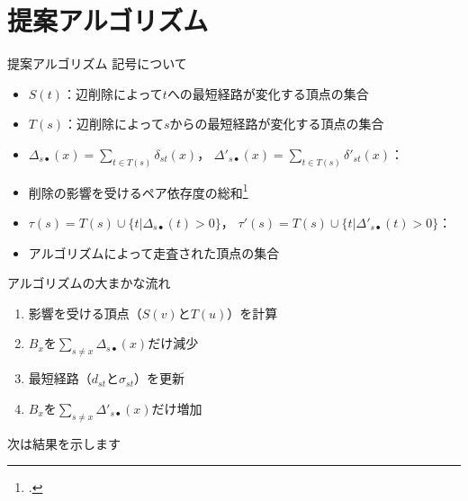 \documentclass[dvipdfmx,fleqn]{beamer}
\begin{document}
\section{提案アルゴリズム}
\begin{frame}[allowframebreaks]{提案アルゴリズム}
  記号について
  \begin{itemize}\small
    \item \alert{$S(t)$}：辺削除によって$t$への最短経路が変化する頂点の集合
    \item \alert{$T(s)$}：辺削除によって$s$からの最短経路が変化する頂点の集合
    \item \alert{$\Delta_{s\bullet}(x)$}$=\sum_{t\in T(s)}\delta_{st}(x)$，
      \alert{$\Delta'_{s\bullet}(x)$}$=\sum_{t\in T(s)}\delta'_{st}(x)$：
    \item[] 削除の影響を受けるペア依存度の総和\footcite{31Bergamini2017}
    \item \alert{$\tau(s)$}$=T(s)\cup\{t|\Delta_{s\bullet}(t)>0\}$，
      \alert{$\tau'(s)$}$=T(s)\cup\{t|\Delta'_{s\bullet}(t)>0\}$：
    \item[] アルゴリズムによって走査された頂点の集合
  \end{itemize}
  \medskip
  アルゴリズムの大まかな流れ
  \begin{enumerate}
  \item 影響を受ける頂点（$S(v)$と$T(u)$）を計算
  \item $B_x$を$\sum_{s\neq x}\Delta_{s\bullet}(x)$だけ減少
  \item 最短経路（$d_{st}$と$\sigma_{st}$）を更新
  \item $B_x$を$\sum_{s\neq x}\Delta'_{s\bullet}(x)$だけ増加
  \end{enumerate}
  \begin{flushright}
    \alert{次は結果を示します}
  \end{flushright}

\end{frame}
\end{document}
